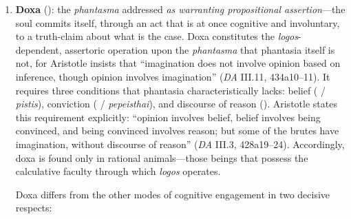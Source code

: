 \begin{itemize}
\begin{itemize}
\begin{itemize}
\begin{enumerate}
                  \item \textbf{Doxa} (): the \textit{phantasma} addressed
                  \textit{as warranting propositional assertion}---the soul commits
                  itself, through an act that is at once cognitive and involuntary, to
                  a truth-claim about what is the case. Doxa constitutes the
                  \textit{logos}-dependent, assertoric operation upon the
                  \textit{phantasma} that phantasia itself is not, for Aristotle
                  insists that ``imagination does not involve opinion based on
                  inference, though opinion involves imagination'' (\textit{DA} III.11,
                  434a10--11). It requires three conditions that phantasia
                  characteristically lacks: belief ( / \textit{pistis}),
                  conviction ( / \textit{pepeisthai}), and discourse of
                  reason (). Aristotle states this requirement explicitly:
                  ``opinion involves belief, belief involves being convinced, and being
                  convinced involves reason; but some of the brutes have imagination,
                  without discourse of reason'' (\textit{DA} III.3, 428a19--24).
                  Accordingly, doxa is found only in rational animals---those beings
                  that possess the calculative faculty through which
                  \textit{logos} operates.

                  Doxa differs from the other modes of cognitive engagement in two
                  decisive respects:


\end{enumerate}
\end{itemize}
\end{itemize}
\end{itemize}
